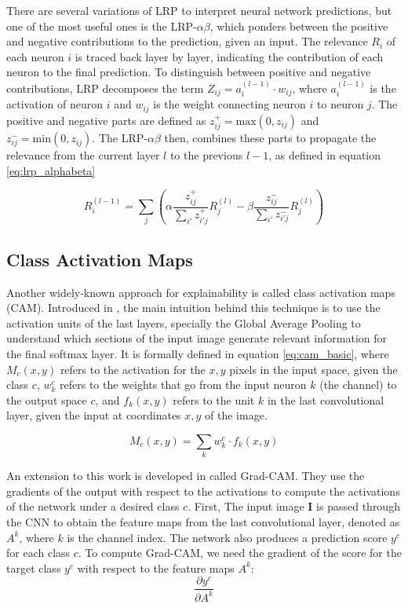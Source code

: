 There are several variations of LRP to interpret neural network predictions, but one of the most useful ones is the LRP-$\alpha\beta$, which ponders between the positive and negative contributions to the prediction, given an input. The relevance $R_i$ of each neuron $i$ is traced back layer by layer, indicating the contribution of each neuron to the final prediction. To distinguish between positive and negative contributions, LRP decomposes the term $Z_{ij} = a_i^{(l-1)} \cdot w_{ij}$, where $a_i^{(l-1)}$ is the activation of neuron $i$ and $w_{ij}$ is the weight connecting neuron $i$ to neuron $j$. The positive and negative parts are defined as $z^+_{ij} = \text{max}(0, z_{ij})$ and $z^-_{ij} = \text{min}(0, z_{ij})$. The  LRP-$\alpha\beta$ then, combines these parts to propagate the relevance from the current layer $l$ to the previous $l-1$, as defined in equation \ref{eq:lrp_alphabeta}

\begin{equation}
	\label{eq:lrp_alphabeta}
	R_i^{(l-1)} = \sum_j \left( \alpha \frac{z_{ij}^+}{\sum_{i'} z_{i'j}^+} R_j^{(l)} - \beta \frac{z_{ij}^-}{\sum_{i'} z_{i'j}^-} R_j^{(l)} \right)
\end{equation}


\subsection{Class Activation Maps}
\label{sec:cam}
Another widely-known approach for explainability is called class activation maps (CAM). Introduced in \cite{zhou2015learning}, the main intuition behind this technique is to use the activation units of the last layers, specially the Global Average Pooling to understand which sections of the input image generate relevant information for the final softmax layer. It is formally defined in equation \ref{eq:cam_basic}, where $M_c(x,y)$ refers to the activation for the $x,y$ pixels in the input space, given the class $c$, $w_k^c$ refers to the weights that go from the input neuron $k$ (the channel) to the output space $c$, and $f_k(x,y)$ refers to the unit $k$ in the last convolutional layer, given the input at coordinates $x,y$ of the image.

\begin{equation}
	\label{eq:cam_basic}
	M_c(x,y) = \sum_{k} w_k^c  \cdot f_k(x,y)
\end{equation}

An extension to this work is developed in \cite{Selvaraju_2019} called Grad-CAM. They use the gradients of the output with respect to the activations to compute the activations of the network under a desired class $c$. First, 
The input image $\mathbf{I}$ is passed through the CNN to obtain the feature maps from the last convolutional layer, denoted as $A^k$, where $k$ is the channel index. The network also produces a prediction score $y^c$ for each class $c$. To compute Grad-CAM, we need the gradient of the score for the target class $y^c$ with respect to the feature maps $A^k$:
\[
\frac{\partial y^c}{\partial A^k}
\]

